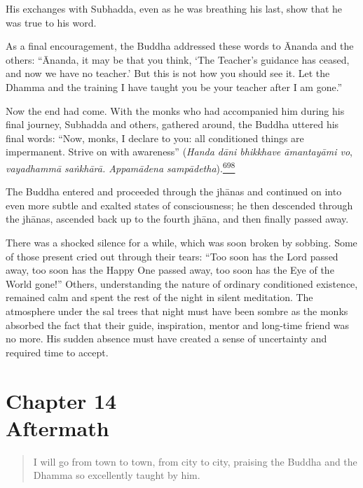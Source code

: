 His exchanges with Subhadda, even as he was breathing his last, show
that he was true to his word.

As a final encouragement, the Buddha addressed these words to Ānanda and
the others: ``Ānanda, it may be that you think, `The Teacher's guidance
has ceased, and now we have no teacher.' But this is not how you should
see it. Let the Dhamma and the training I have taught you be your
teacher after I am gone.''

Now the end had come. With the monks who had accompanied him during his
final journey, Subhadda and others, gathered around, the Buddha uttered
his final words: ``Now, monks, I declare to you: all conditioned things
are impermanent. Strive on with awareness'' (\emph{Handa dāni bhikkhave
āmantayāmi vo}, \emph{vayadhammā saṅkhārā. Appamādena
sampādetha}).\label{footprints_split_017.html_fnref698}\hyperref[footprints_split_025.htmlux5cux23fn698]{\textsuperscript{698}}

The Buddha entered and proceeded through the jhānas and continued on
into even more subtle and exalted states of consciousness; he then
descended through the jhānas, ascended back up to the fourth jhāna, and
then finally passed away.

There was a shocked silence for a while, which was soon broken by
sobbing. Some of those present cried out through their tears: ``Too soon
has the Lord passed away, too soon has the Happy One passed away, too
soon has the Eye of the World gone!'' Others, understanding the nature
of ordinary conditioned existence, remained calm and spent the rest of
the night in silent meditation. The atmosphere under the sal trees that
night must have been sombre as the monks absorbed the fact that their
guide, inspiration, mentor and long-time friend was no more. His sudden
absence must have created a sense of uncertainty and required time to
accept.

\label{footprints_split_017.html_calibre_pb_35}

\label{footprints_split_018.html}{}

\section{\texorpdfstring{{Chapter 14}\\
Aftermath}{Chapter 14 Aftermath}}\label{footprints_split_018.html_TOCTarget14}

\begin{quote}
I will go from town to town, from city to city, praising the Buddha and
the Dhamma so excellently taught by him.
\end{quote}

